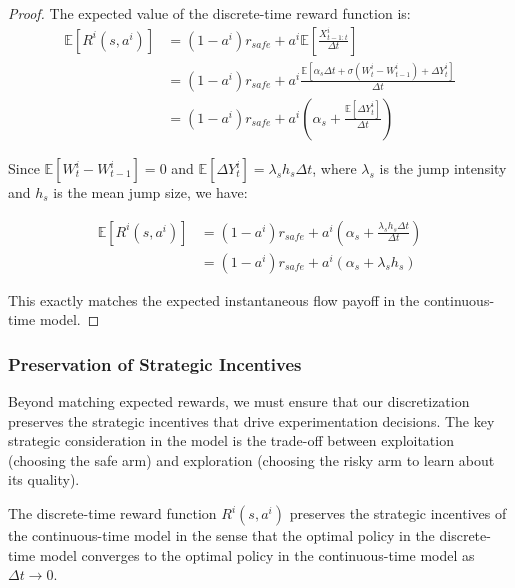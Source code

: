 \begin{proof}
    The expected value of the discrete-time reward function is:
    \begin{align}
        \mathbb{E}[R^i(s, a^i)] & = (1-a^i)r_\textit{safe} + a^i\mathbb{E}\left[\frac{X^i_{t-1:t}}{\Delta t}\right]                                       \\
                                & = (1-a^i)r_\textit{safe} + a^i\frac{\mathbb{E}[\alpha_s \Delta t + \sigma(W^i_t - W^i_{t-1}) + \Delta Y^i_t]}{\Delta t} \\
                                & = (1-a^i)r_\textit{safe} + a^i\left(\alpha_s + \frac{\mathbb{E}[\Delta Y^i_t]}{\Delta t}\right)
    \end{align}

    Since $\mathbb{E}[W^i_t - W^i_{t-1}] = 0$ and $\mathbb{E}[\Delta Y^i_t] = \lambda_s h_s\Delta t$, where $\lambda_s$ is the jump intensity and $h_s$ is the mean jump size, we have:

    \begin{align}
        \mathbb{E}[R^i(s, a^i)] & = (1-a^i)r_\textit{safe} + a^i\left(\alpha_s + \frac{\lambda_s h_s\Delta t}{\Delta t}\right) \\
                                & = (1-a^i)r_\textit{safe} + a^i(\alpha_s + \lambda_s h_s)
    \end{align}

    This exactly matches the expected instantaneous flow payoff in the continuous-time model.
\end{proof}


\iffalse
    \subsubsection{Preservation of Strategic Incentives}
    \label{appendix:strategic_incentives}

    Beyond matching expected rewards, we must ensure that our discretization preserves the strategic incentives that drive experimentation decisions. The key strategic consideration in the model is the trade-off between exploitation (choosing the safe arm) and exploration (choosing the risky arm to learn about its quality).

    \begin{proposition}
        The discrete-time reward function $R^i(s, a^i)$ preserves the strategic incentives of the continuous-time model in the sense that the optimal policy in the discrete-time model converges to the optimal policy in the continuous-time model as $\Delta t \to 0$.

    \end{proposition}

